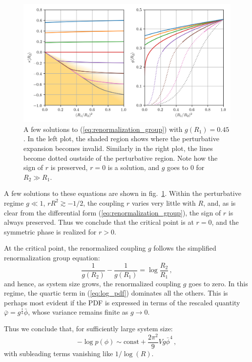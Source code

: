 \documentclass[11pt,a4paper]{article}
\begin{document}
\begin{figure}
\begin{center}
\includegraphics[scale=0.75]{renormalization_group.png}
\end{center}
    \caption{\label{fig:renormalization_group} A few solutions to
    (\ref{eq:renormalization_group}) with $g(R_1) = 0.45$.  In the left plot,
    the shaded region shows where the perturbative expansion becomes invalid.
    Similarly in the right plot, the lines become dotted oustside of the
    perturbative region. Note how the sign of $r$ is preserved, $r = 0$ is a
    solution, and $g$ goes to $0$ for $R_2 \gg R_1$.}
\end{figure}

A few solutions to these equations are shown in
fig.~\ref{fig:renormalization_group}. Within the perturbative regime $g \ll 1$,
$r R^2 \gtrsim -1/2$, the coupling $r$ varies very little with $R$, and, as is
clear from the differential form (\ref{eq:renormalization_group}), the sign of
$r$ is always preserved. Thus we conclude that the critical point is at $r
= 0$, and the symmetric phase is realized for $r > 0$.

At the critical point, the renormalized coupling $g$ follows the simplified renormalization group equation:
\begin{equation}
    \frac{1}{g(R_2)} - \frac{1}{g(R_1)} = \log\frac{R_2}{R_1}\,,
\end{equation}
and hence, as system size grows, the renormalized coupling $g$ goes to zero.
In this regime, the quartic term in (\ref{eq:log_pdf}) dominates all the
others. This is perhaps most evident if the PDF is expressed in terms of the
rescaled quantity $\bar{\varphi} = g^{\frac{1}{4}} \bar{\phi}$, whose
variance remains finite as $g\to0$.

Thus we conclude that, for sufficiently large system size: 
\begin{equation}
    \label{eq:log_pdf_critical_point}
    -\log p(\phi) \sim \mathrm{const} + \frac{2\pi^2}{9} V g\bar{\phi}^4\,,
\end{equation}
with subleading terms vanishing like $1 / \log(R)$.
\end{document}
